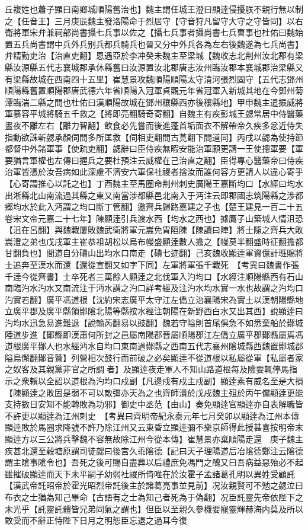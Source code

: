 丘複姓也蕭子顯曰南鄉城順陽舊治也】魏主謂任城王澄曰顯逹侵擾朕不親行無以制之【任音王】三月庚辰魏主發洛陽命于烈居守【守音狩凡留守大守之守皆同】以右衛將軍宋弁兼祠部尚書攝七兵事以佐之【攝七兵事者攝尚書七兵曹事也杜佑曰魏始置五兵尚書謂中兵外兵别兵都兵騎兵也晉又分中外兵各為左右後魏遂為七兵尚書】弁精勤吏治【治直吏翻】恩遇亞於李冲癸未魏主至梁城【魏收志北荆州汝北郡有梁縣汝源縣五代志襄城郡承休縣舊曰汝源置汝北郡唐志汝州臨汝郡本襄城郡治梁縣又有梁縣故城在西南四十五里】崔慧景攻魏順陽順陽太守清河張烈固守【五代志鄧州順陽縣舊置順陽郡唐武德六年省順陽入冠軍貞觀元年省冠軍入新城其地在今鄧州菊潭臨湍二縣之間也杜佑曰漢順陽故城在鄧州穰縣西亦後穰縣地】甲申魏主遣振威將軍慕容平城將騎五千救之【將即亮翻騎奇寄翻】自魏主有疾彭城王勰常居中侍醫藥晝夜不離左右【離力智翻】飲食必先嘗而後進蓬首垢面衣不解帶帝久疾多忿近侍失指動欲誅斬勰承顏伺間多所匡救【伺相吏翻間古莧翻下間道同】丙戌以勰為使持節都督中外諸軍事【使疏吏翻】勰辭曰臣侍疾無暇安能治軍願更請一王使摠軍要【軍要猶言軍權也左傳曰握兵之要杜預注云威權在己治直之翻】臣得專心醫藥帝曰侍疾治軍皆憑於汝吾病如此深慮不濟安六軍保社禝者捨汝而誰何容方更請人以違心寄乎【心寄謂推心以託之也】丁酉魏主至馬圈命荆州刺史廣陽王嘉斷均口【水經曰均水出淅縣北山南流過其縣之東又南當涉都縣邑北南入于沔注云即郡國志筑陽縣之涉都郷均水於此入沔謂之均口斷丁管翻】邀齊兵歸路嘉建之子也【楚王建見一百二十五卷宋文帝元嘉二十七年】陳顯逹引兵渡水西【均水之西也】據鷹子山築城人情沮恐【沮在呂翻】與魏戰屢敗魏武衛將軍元嵩免胄䧟陳【陳讀曰陣】將士隨之齊兵大敗嵩澄之弟也戊戌軍主崔恭祖胡松以烏布幔盛顯逹數人擔之【幔莫半翻盛時征翻擔都甘翻負也】間道自分磧山出均水口南走【磧七迹翻】己亥魏收顯逹軍資億計班賜將士追奔至漢水而還【還從宣翻又如字下同】左軍將軍張千戰死　【考異曰魏書作張千逹今從齊書】士卒死者三萬餘人顯逹之北伐軍入汋均口【水經注順陽縣西有石山南臨汋水汋水又南流注于沔水謂之汋口詳考經及注汋水均水實一水也故謂之汋均口汋實若翻】廣平馮道根【沈約宋志廣平太守江左僑立治襄陽宋為實土以漢朝陽縣地立廣平郡及廣平縣領鄼隂北陽等縣按水經注朝陽在新野西白水又出其西】說顯逹曰汋均水迅急易進難退【說輸芮翻易以豉翻】魏若守隘則首尾俱急不如悉棄船於鄼城陸道步進【鄼縣即漢蕭何所封之邑屬南陽郡晉屬順陽郡江左僑立廣平郡鄼縣屬焉馮道根廣平鄼人也水經沔水自均口東南過鄼縣之西南五代志襄州隂城縣西魏置鄼城郡隘烏懈翻鄼音贊】列營相次鼓行而前破之必矣顯逹不從道根以私屬從軍【私屬者家之奴客及其親黨非官之所調者】及顯逹夜走軍人不知山路道根每及險要輒停馬指示之衆賴以全詔以道根為汋均口戍副【凡邊戍有戍主戍副】顯逹素有威名至是大損【陳顯逹之敗固是弱不可以敵彊亦天為之也齊師潰於戊戌魏主殂於丙午儻顯逹更能支持數日安知不能轉敗為功邪】御史中丞范【由山】奏免顯逹官顯逹亦自表解職皆不許更以顯逹為江州刺史　【考異曰齊明帝紀永泰元年七月癸卯以顯逹為江州本傳顯逹敗於馬圈求降號不許乃除江州又云東昏立顯逹彌不樂京師得此授甚喜按明帝末顯逹方以三公將兵擊魏不容無故除江州今從本傳】崔慧景亦棄順陽走還　庚子魏主疾甚北還至穀塘原謂司徒勰曰後宫久乖隂德【記曰天子理陽道后冶隂德鄭注云隂德謂主隂事隂令也】吾死之後可賜自盡葬以后禮庶免馮門之醜又曰吾病益惡殆必不起雖摧破顯逹而天下未平嗣子幼弱社禝所倚唯在於汝霍子孟諸葛孔明以異姓受顧託【漢武帝託昭帝於霍光昭烈帝託後主於諸葛亮事並見前】况汝親賢可不勉之勰泣曰布衣之士猶為知己畢命【古語有之士為知己者死為于偽翻】况臣託靈先帝依陛下之末光乎【託靈託體皆兄弟同氣之謂也】但臣以至親久參機要寵靈輝赫海内莫及所以敢受而不辭正恃陛下日月之明恕臣忘退之過耳今復